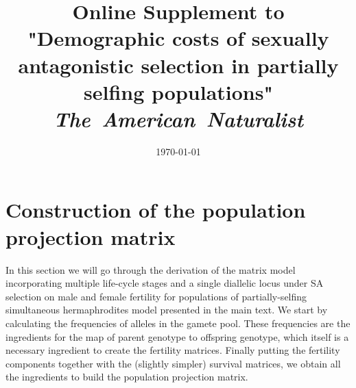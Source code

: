 \documentclass[11pt]{article}
\title{Online Supplement to "Demographic costs of sexually antagonistic selection in partially selfing populations" \\ 
\textit{The~American~Naturalist} }
\date{\today}
\begin{document}
\maketitle






% 
%
%

\renewcommand{\theequation}{S\arabic{equation}}
\renewcommand{\thetable}{S\arabic{table}}
\renewcommand{\thesection}{Supplement~\arabic{section}}
\renewcommand{\thefigure}{S\arabic{figure}}
\setcounter{equation}{0}  %
\setcounter{figure}{0}
\setcounter{table}{0}


\newpage{}
\section{Construction of the population projection matrix}

In this section we will go through the derivation of the matrix model incorporating multiple life-cycle stages and a single diallelic locus under SA selection on male and female fertility for populations of partially-selfing simultaneous hermaphrodites model presented in the main text. We start by calculating the frequencies of alleles in the gamete pool. These frequencies are the ingredients for the map of parent genotype to offspring genotype, which itself is a necessary ingredient to create the fertility matrices. Finally putting the fertility components together with the (slightly simpler) survival matrices, we obtain all the ingredients to build the population projection matrix. 
\end{document}

